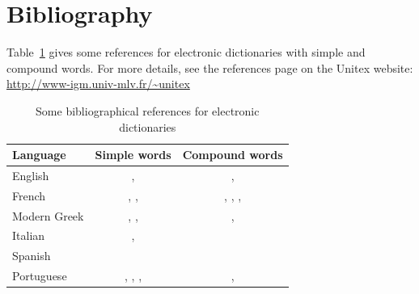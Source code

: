 \section{Bibliography}


Table~\ref{ref-dicos} gives some references for electronic dictionaries with simple and 
compound words. For more details, see the references page on the Unitex website: \\
\url{http://www-igm.univ-mlv.fr/~unitex}

\begin{table}[!h]
\begin{center}
\begin{tabular}{|l|c|c|}
\hline
\textbf{Language} & \textbf{Simple words} & \textbf{Compound words} \\
\hline
English & \cite{klarsfeld}, \cite{monceaux-1995} & \cite{delac-anglais},
\cite{these-Savary} \\
\hline
French & \cite{formes-ambigues}, \cite{dicos-francais}, \cite{jacques-1995} & \cite{dicos-francais},
\cite{Gross96},
\cite{max-1993},
\cite{syntaxe-de-ladverbe} \\
\hline
Modern Greek & \cite{modern-greek}, \cite{matthieu-anastasia}, \cite{these-tita} & \cite{tita-2002},
\cite{anastasia-2002} \\
\hline
Italian & \cite{delaf-italien}, \cite{delaf-italien-book} & \cite{composes-italien} \\
\hline
Spanish & \cite{blanco-2000} & \cite{blanco-1997} \\
\hline
Portuguese & \cite{eleuterio1995}, \cite{ranchhod1996b}, \cite{ranchhodd1998},
\cite{muniz2005} & \cite{ranchhod1991}, \cite{ranchhodd1998} \\
\hline
\end{tabular}
\caption{Some bibliographical references for electronic dictionaries\label{ref-dicos}}
\end{center}
\end{table}
